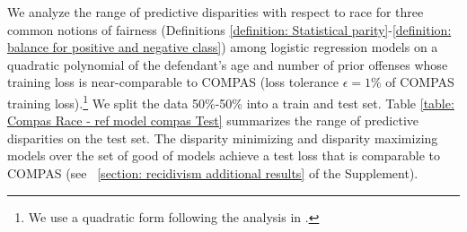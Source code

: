 \documentclass{article}
\begin{document}
We analyze the range of predictive disparities with respect to race for three common notions of fairness (Definitions \ref{definition: Statistical parity}-\ref{definition: balance for positive and negative class}) among logistic regression models on a quadratic polynomial of the defendant's age and number of prior offenses whose training loss is near-comparable to COMPAS (loss tolerance $\epsilon = 1\%$ of COMPAS training loss).\footnote{We use a quadratic form following the analysis in \cite{Rudin2020Age}.} We split the data 50\%-50\% into a train and test set. Table \ref{table: Compas Race - ref model compas Test} summarizes the range of predictive disparities on the test set. The disparity minimizing and disparity maximizing models over the set of good of models achieve a test loss that is comparable to COMPAS (see \textsection~\ref{section: recidivism additional results} of the Supplement).

\end{document}
